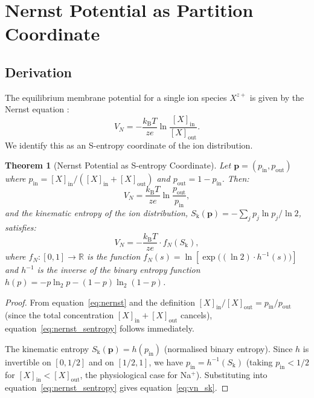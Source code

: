\documentclass[11pt,twocolumn,a4paper]{article}
\newtheorem{theorem}{Theorem}[section]
\theoremstyle{definition}
\theoremstyle{remark}
\newcommand{\kB}{k_{\mathrm{B}}}
\newcommand{\Sk}{S_{\mathrm{k}}}
\begin{document}
\section{Nernst Potential as Partition Coordinate}
\label{sec:nernst}

\subsection{Derivation}

The equilibrium membrane potential for a single ion species $X^{z+}$ is given by
the Nernst equation \citep{nernst1888}:
\begin{equation}
V_N = -\frac{\kB T}{ze} \ln\frac{[X]_{\mathrm{in}}}{[X]_{\mathrm{out}}}.
\label{eq:nernst}
\end{equation}
We identify this as an S-entropy coordinate of the ion distribution.

\begin{theorem}[Nernst Potential as S-entropy Coordinate]
\label{thm:nernst}
Let $\bm{p} = (p_{\mathrm{in}}, p_{\mathrm{out}})$ where
$p_{\mathrm{in}} = [X]_{\mathrm{in}} / ([X]_{\mathrm{in}} + [X]_{\mathrm{out}})$
and $p_{\mathrm{out}} = 1 - p_{\mathrm{in}}$. Then:
\begin{equation}
V_N = \frac{\kB T}{ze} \ln\frac{p_{\mathrm{out}}}{p_{\mathrm{in}}},
\label{eq:nernst_sentropy}
\end{equation}
and the kinematic entropy of the ion distribution,
$\Sk(\bm{p}) = -\sum_j p_j \ln p_j / \ln 2$, satisfies:
\begin{equation}
V_N = -\frac{\kB T}{ze} \cdot f_N(\Sk),
\label{eq:vn_sk}
\end{equation}
where $f_N: [0,1] \to \mathbb{R}$ is the function
$f_N(s) = \ln\!\left[\exp\!\bigl((\ln 2)\cdot h^{-1}(s)\bigr)\right]$
and $h^{-1}$ is the inverse of the binary entropy function
$h(p) = -p \ln_2 p - (1-p) \ln_2(1-p)$.
\end{theorem}

\begin{proof}
From equation~\eqref{eq:nernst} and the definition
$[X]_{\mathrm{in}}/[X]_{\mathrm{out}} = p_{\mathrm{in}}/p_{\mathrm{out}}$
(since the total concentration $[X]_{\mathrm{in}} + [X]_{\mathrm{out}}$
cancels), equation~\eqref{eq:nernst_sentropy} follows immediately.

The kinematic entropy $\Sk(\bm{p}) = h(p_{\mathrm{in}})$ (normalised binary
entropy). Since $h$ is invertible on $[0, 1/2]$ and on $[1/2, 1]$, we have
$p_{\mathrm{in}} = h^{-1}(\Sk)$ (taking $p_{\mathrm{in}} < 1/2$ for
$[X]_{\mathrm{in}} < [X]_{\mathrm{out}}$, the physiological case for Na$^+$).
Substituting into equation~\eqref{eq:nernst_sentropy} gives
equation~\eqref{eq:vn_sk}.
\end{proof}
\end{document}
